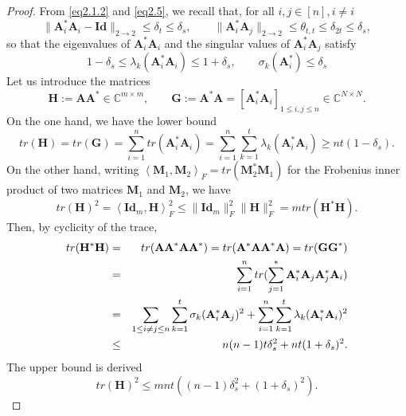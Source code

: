 \begin{proof}
    From \cref{eq2.1.2} and \cref{eq2.5}, we recall that, for all $i,j \in [n], i \neq i$
    \[
        \|\mathbf{A}_i^*\mathbf{A}_i - \mathbf{Id}\|_{2 \rightarrow 2} \leq \delta_t \leq \delta_s, \qquad \|\mathbf{A}_i^*\mathbf{A}_j\|_{2 \rightarrow 2} \leq \theta_{t,t} \leq \delta_{2t} \leq \delta_s,
    \]
    so that the eigenvalues of $\mathbf{A}_i^*\mathbf{A}_i$ and the singular values of $\mathbf{A}_i^*\mathbf{A}_j$ satisfy
    \[
        1 - \delta_s \leq \lambda_k(\mathbf{A}_i^*\mathbf{A}_i) \leq 1 + \delta_s, \qquad \sigma_k(\mathbf{A}_i^*) \leq \delta_s
    \]
    Let us introduce the matrices 
    \[
        \mathbf{H} := \mathbf{AA}^* \in \mathbb{C}^{m \times m}, \qquad \mathbf{G} := \mathbf{A}^*\mathbf{A} = [\mathbf{A}_i^* \mathbf{A}_i]_{1 \leq i, j\leq n} \in \mathbb{C}^{N \times N}.
    \]
    On the one hand, we have the lower bound
    \begin{equation}
        tr(\mathbf{H}) = tr(\mathbf{G}) = \sum\limits_{i = 1}^n tr(\mathbf{A}_i^* \mathbf{A}_i) = \sum\limits_{i=1}^n \sum\limits_{k=1}^t \lambda_k(\mathbf{A}_i^*\mathbf{A}_i) \geq nt (1- \delta_s).
        \label{eq2.10}
    \end{equation}
    On the other hand, writing $\left<\mathbf{M}_1,\mathbf{M}_2\right>_F = tr(\mathbf{M}_2^* \mathbf{M}_1)$ for the Frobenius inner product of two matrices $\mathbf{M}_1$ and $\mathbf{M}_2$, we have
    \[
        tr(\mathbf{H})^2 = \left<\mathbf{Id}_m, \mathbf{H}\right>_F^2 \leq \|\mathbf{Id}_m\|_F^2 \|\mathbf{H}\|_F^2 = m tr(\mathbf{H}^*\mathbf{H}).
    \]
    Then, by cyclicity of the trace,
    \begin{eqnarray}
        tr(\mathbf{H}^*\mathbf{H}) &=& tr(\mathbf{AA}^*\mathbf{AA}^*) = tr(\mathbf{A}^*\mathbf{AA}^*\mathbf{A}) = tr(\mathbf{GG}^*) \notag \\
        &=& \sum\limits_{i=1}^n tr(\sum\limits_{j=1}^* \mathbf{A}_i^* \mathbf{A}_j \mathbf{A}_j^* \mathbf{A}_i) \notag \\
    &=& \sum\limits_{1 \leq i \neq j \leq n} \sum\limits_{k=1}^t \sigma_k(\mathbf{A}_i^* \mathbf{A}_j)^2 + \sum\limits_{i=1}^n \sum\limits_{k=1} ^t \lambda_k (\mathbf{A}_i^* \mathbf{A}_i)^2 \notag \\
        &\leq& n (n-1) t \delta_s^2 + nt(1+\delta_s)^2. \notag 
    \end{eqnarray}
    The upper bound is derived
    \begin{equation}
        tr(\mathbf{H})^2 \leq m n t \left( (n-1)\delta_s^2 + (1+ \delta_s)^2 \right).
        \label{eq2.11}
    \end{equation}

\end{proof}

